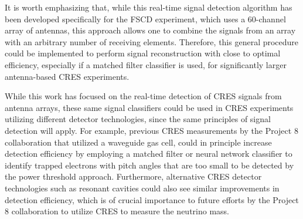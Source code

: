It is worth emphasizing that, while this real-time signal detection algorithm has been developed specifically for the FSCD experiment, which uses a 60-channel array of antennas, this approach allows one to combine the signals from an array with an arbitrary number of receiving elements. Therefore, this general procedure could be implemented to perform signal reconstruction with close to optimal efficiency, especially if a matched filter classifier is used, for significantly larger antenna-based CRES experiments.

While this work has focused on the real-time detection of CRES signals from antenna arrays, these same signal classifiers could be used in CRES experiments utilizing different detector technologies, since the same principles of signal detection will apply. For example, previous CRES measurements by the Project 8 collaboration that utilized a waveguide gas cell, could in principle increase detection efficiency by employing a matched filter or neural network classifier to identify trapped electrons with pitch angles that are too small to be detected by the power threshold approach. Furthermore, alternative CRES detector technologies such as resonant cavities \cite{p8snowmass2022} could also see similar improvements in detection efficiency, which is of crucial importance to future efforts by the Project 8 collaboration to utilize CRES to measure the neutrino mass.
